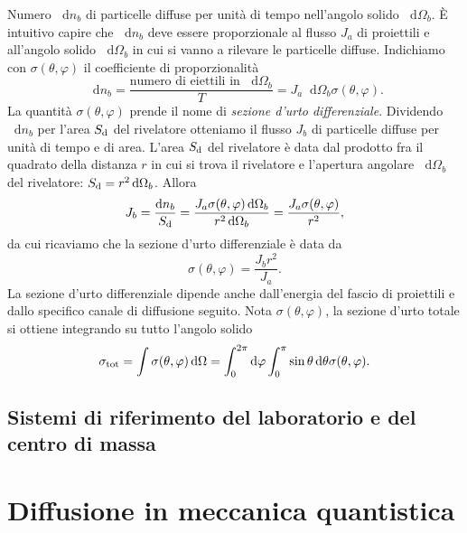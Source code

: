 \documentclass[a4paper,fleqn,twoside,12pt]{article}
\renewcommand{\phi}{\varphi}
\newcommand*{\dd}{\mathop{}\!\mathrm{d}} %
\begin{document}
Numero $\dd n_{b}$ di particelle diffuse per unità di tempo nell'angolo solido
$\dd\Omega_{b}$.  È intuitivo capire che $\dd n_{b}$ deve essere proporzionale
al flusso $J_{a}$ di proiettili e all'angolo solido $\dd\Omega_{b}$ in cui si
vanno a rilevare le particelle diffuse.  Indichiamo con $\sigma(\theta,\phi)$ il
coefficiente di proporzionalità
\begin{equation}
  \dd n_{b} = \frac{\text{numero di eiettili in $\dd\Omega_{b}$}}{T} = J_{a}
  \dd\Omega_{b} \sigma(\theta,\phi).
\end{equation}
La quantità $\sigma(\theta,\phi)$ prende il nome di
\emph{sezione d'urto differenziale}.  Dividendo $\dd n_{b}$ per l'area
$S_{\textup{d}}$ del rivelatore otteniamo il flusso $J_{b}$ di particelle
diffuse per unità di tempo e di area.  L'area $S_{\textup{d}}$ del rivelatore è
data dal prodotto fra il quadrato della distanza $r$ in cui si trova il
rivelatore e l'apertura angolare $\dd\Omega_{b}$ del rivelatore:
$S_{\textup{d}} = r^{2}\dd\Omega_{b}$.  Allora
\begin{equation}
  J_{b} = \frac{\dd n_{b}}{S_{\textup{d}}} = \frac{J_{a} \sigma(\theta,\phi)
    \dd\Omega_{b}}{r^{2} \dd\Omega_{b}} = \frac{J_{a}
    \sigma(\theta,\phi)}{r^{2}},
\end{equation}
da cui ricaviamo che la sezione d'urto differenziale è data da
\begin{equation}
  \label{eq:sez-urto}
  \sigma(\theta,\phi) = \frac{J_{b}r^{2}}{J_{a}}.
\end{equation}
La sezione d'urto differenziale dipende anche dall'energia del fascio di
proiettili e dallo specifico canale di diffusione seguito.  Nota
$\sigma(\theta,\phi)$, la sezione d'urto totale si ottiene integrando su tutto
l'angolo solido
\begin{equation}
  \sigma_{\textup{tot}} = \int \sigma(\theta,\phi) \dd\Omega = \int_{0}^{2\pi}
  \dd \phi \int_{0}^{\pi} \sin \theta \dd\theta \sigma(\theta,\phi).
\end{equation}

\subsection{Sistemi di riferimento del laboratorio e del centro di massa}
\label{sec:sistemi-riferimento}

\section{Diffusione in meccanica quantistica}
\label{sec:meccanica-quantistica}
\end{document}
